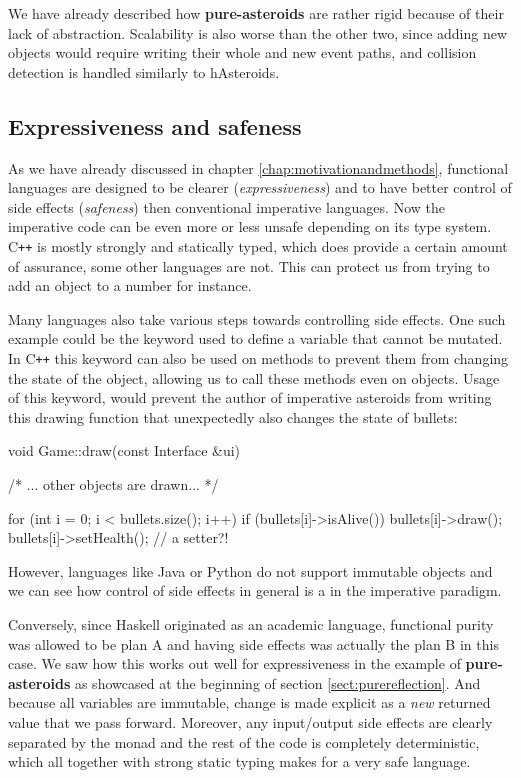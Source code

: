 \documentclass[
  digital, %
  color,   %
  table,   %
  oneside, %
  lof,     %
  lot,     %
]{fithesis3}
\newcommand{\cpp}{C\nolinebreak\texttt{+}\nolinebreak\texttt{+}}
\begin{document}
{We have already described how \textbf{pure-asteroids} are rather rigid because of
their lack of abstraction. Scalability is also worse than the other two, since
adding new objects would require writing their whole  and
new event paths, and collision detection is handled similarly to hAsteroids.

\subsection{Expressiveness and safeness}

As we have already discussed in chapter \ref{chap:motivationandmethods},
functional languages are designed to be clearer (\emph{expressiveness})
and to have better control of side effects (\emph{safeness}) then conventional
imperative languages. Now the imperative code can be even more or less unsafe
depending on its type system. \cpp{} is mostly strongly and statically typed, which
does provide a certain amount of assurance, some other languages are not.
This can protect us from trying to add an object to a number for instance.

Many languages also take various steps towards controlling side effects.
One such example could be the  keyword used to define a variable
that cannot be mutated. In \cpp{} this keyword can also be used on methods
to prevent them from changing the state of the object, allowing us to call these
methods even on  objects. Usage of this keyword, would prevent
the author of imperative asteroids from writing this drawing function that
unexpectedly also changes the state of bullets:
\begin{cppblock}
void Game::draw(const Interface &ui) {

    /* ... other objects are drawn... */
    
    for (int i = 0; i < bullets.size(); i++) {
        if (bullets[i]->isAlive()) {
            bullets[i]->draw();
            bullets[i]->setHealth(); // a setter?!
        }
    }
}
\end{cppblock}
However, languages like Java or Python do not support immutable objects
and we can see how control of side effects in general is a  in the imperative paradigm.

Conversely, since Haskell originated as an academic language,
functional purity was allowed to be plan A and having
side effects was actually the plan B in this case. We saw how this works out well for expressiveness
in the example of \textbf{pure-asteroids} as showcased at the beginning of section \ref{sect:purereflection}.
And because all variables are immutable, change is made explicit as a \emph{new} returned value
that we pass forward.
Moreover, any input/output side effects are clearly separated by the  monad
and the rest of the code is completely deterministic, which all together with strong static typing
makes for a very safe language.

}
\end{document}
